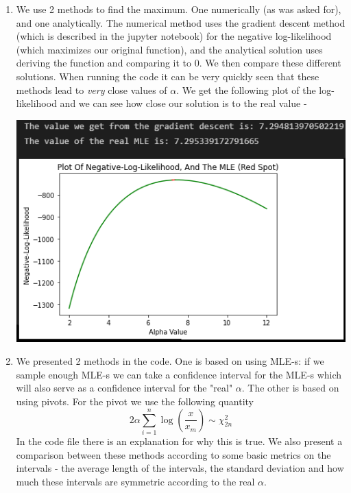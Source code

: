 \documentclass[../main.tex]{subfiles}
\begin{document}
\begin{enumerate}
\item We use 2 methods to find the maximum. One numerically (as was asked for), and one analytically. The numerical method uses the gradient descent method (which is described in the jupyter notebook) for the negative log-likelihood (which maximizes our original function), and the analytical solution uses deriving the function and comparing it to 0. We then compare these different solutions. When running the code it can be very quickly seen that these methods lead to \emph{very} close values of $\alpha$. We get the following plot of the log-likelihood and we can see how close our solution is to the real value - 

\begin{mdframed}[backgroundcolor=blue!20] 
    \begin{center}
        \includegraphics[scale=0.7]{images/Plot And Values.png}
    \end{center}
\end{mdframed}
\item We presented 2 methods in the code. One is based on using MLE-s: if we sample enough MLE-s we can take a confidence interval for the MLE-s which will also serve as a confidence interval for the "real" $\alpha$. The other is based on using pivots. For the pivot we use the following quantity 
\[2\alpha\sum_{i=1}^n \log\left(\frac{x}{x_m}\right)\sim\chi_{2n}^2\]
In the code file there is an explanation for why this is true. We also present a comparison between these methods according to some basic metrics on the intervals - the average length of the intervals, the standard deviation and how much these intervals are symmetric according to the real $\alpha$. 


\end{enumerate}
\end{document}
